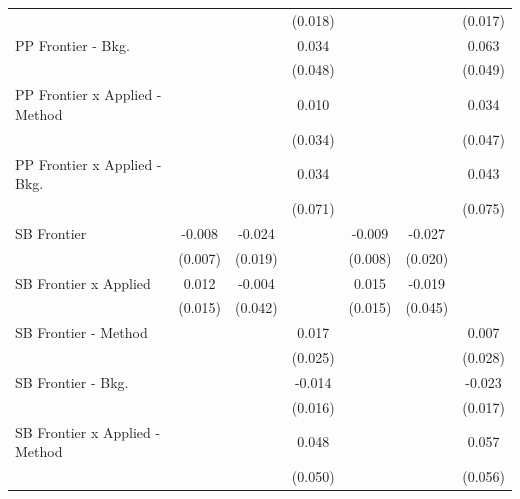 \begin{tabular}{lcccccc}
                                  &              &         & (0.018)      &               &             & (0.017)\\   
   PP Frontier - Bkg.             &              &         & 0.034        &               &             & 0.063\\   
                                  &              &         & (0.048)      &               &             & (0.049)\\   
   PP Frontier x Applied - Method &              &         & 0.010        &               &             & 0.034\\   
                                  &              &         & (0.034)      &               &             & (0.047)\\   
   PP Frontier x Applied - Bkg.   &              &         & 0.034        &               &             & 0.043\\   
                                  &              &         & (0.071)      &               &             & (0.075)\\   
   SB Frontier                    & -0.008       & -0.024  &              & -0.009        & -0.027      &   \\   
                                  & (0.007)      & (0.019) &              & (0.008)       & (0.020)     &   \\   
   SB Frontier x Applied          & 0.012        & -0.004  &              & 0.015         & -0.019      &   \\   
                                  & (0.015)      & (0.042) &              & (0.015)       & (0.045)     &   \\   
   SB Frontier - Method           &              &         & 0.017        &               &             & 0.007\\   
                                  &              &         & (0.025)      &               &             & (0.028)\\   
   SB Frontier - Bkg.             &              &         & -0.014       &               &             & -0.023\\   
                                  &              &         & (0.016)      &               &             & (0.017)\\   
   SB Frontier x Applied - Method &              &         & 0.048        &               &             & 0.057\\   
                                  &              &         & (0.050)      &               &             & (0.056)\\   

\end{tabular}
